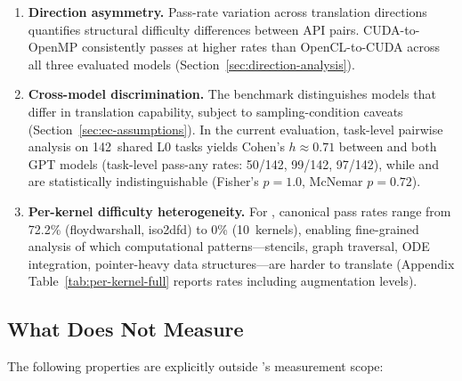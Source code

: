 \begin{enumerate}
  \item \textbf{Direction asymmetry.} Pass-rate variation across translation 
    directions quantifies structural difficulty differences between API pairs. 
    CUDA-to-OpenMP consistently passes at higher rates than OpenCL-to-CUDA 
    across all three evaluated models (Section~\ref{sec:direction-analysis}).
    \item \textbf{Cross-model discrimination.} The benchmark distinguishes models that differ in translation capability, subject to sampling-condition caveats (Section~\ref{sec:ec-assumptions}). In the current evaluation, task-level pairwise analysis on 142~shared L0 tasks yields Cohen's $h \approx 0.71$ between \qwenshort{} and both GPT models (task-level pass-any rates: \qwenshort{} 50/142, \gptnew{} 99/142, \codex{} 97/142), while \gptnew{} and \codex{} are statistically indistinguishable (Fisher's $p = 1.0$, McNemar $p = 0.72$).
    
    \item \textbf{Per-kernel difficulty heterogeneity.} For \qwenshort{}, canonical pass rates range from 72.2\% (floydwarshall, iso2dfd) to 0\% (10~kernels), enabling fine-grained analysis of which computational patterns---stencils, graph traversal, ODE integration, pointer-heavy data structures---are harder to translate (Appendix Table~\ref{tab:per-kernel-full} reports rates including augmentation levels).

\end{enumerate}

\subsection{What \parbench{} Does Not Measure}
\label{sec:ec-not-measures}

The following properties are explicitly outside \parbench{}'s measurement scope:

